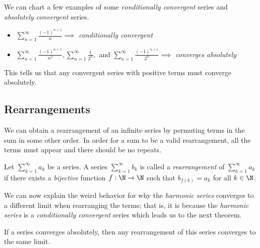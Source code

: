 We can chart a few examples of some \textit{conditionally convergent } series and \textit{absolutely convergent} series.

\begin{itemize}
    \item \(\sum_{n=1}^{\infty} \frac{(-1)^{n+1}}{n} \implies \) \textit{conditionally convergent}
    \item \(\sum_{n=1}^{\infty} \frac{(-1)^{n+1}}{n^2}, \sum_{n=1}^{\infty} \frac{1}{2^n},  \) and \( \sum_{n=1}^{\infty} \frac{(-1)^{n+1}}{2^n} \implies \) \textit{converges absolutely} 
\end{itemize}

This tells us that any convergent series with positive terms must converge absolutely. 

\subsection{Rearrangements}

We can obtain a rearrangement of an infinite series by permuting terms in the sum in some other order. In order for a sum to be a valid rearrangement, all the terms must appear and there should be no repeats.

\begin{tcolorbox}
\begin{defn}
    Let \( \sum_{k=1}^{\infty} a_k\) be a series. A series \( \sum_{k=1}^{\infty} b_k\) is called a \textit{rearrangement} of \(\sum_{k=1}^{\infty} a_k \) if there exists a \textit{bijective} function \(f: \N \to \N \) such that \( b_{f(k)} = a_k \) for all \( k \in \N \).
\end{defn}
\end{tcolorbox}

We can now explain the weird behavior for why the \textit{harmonic series} converges to a different limit when rearranging the terms; that is, it is because the \textit{harmonic series} is a \textit{conditionally convergent} series which leads us to the next theorem. 

\begin{tcolorbox}
\begin{thm}
If a series converges absolutely, then any rearrangement of this series converges to the same limit.
\end{thm}
\end{tcolorbox}

